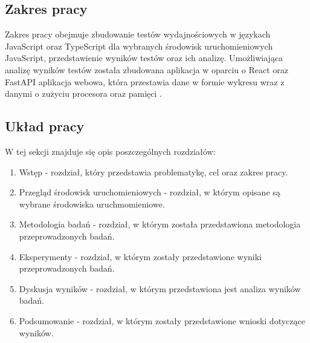 \subsection{Zakres pracy}
Zakres pracy obejmuje zbudowanie testów wydajnościowych w językach JavaScript oraz TypeScript dla wybranych środowisk uruchomieniowych JavaScript, przedstawienie wyników testów oraz ich analizę. Umożliwiająca analizę wyników testów została zbudowana aplikacja w oparciu o React \cite{React} oraz FastAPI \cite{FastAPI} aplikacja webowa, która przestawia dane w formie wykresu wraz z danymi o zużyciu procesora oraz pamięci .

\subsection{Układ pracy}
W tej sekcji znajduje się opis poszczególnych rozdziałów:
\begin{enumerate}
  \item Wstęp - rozdział, który przedstawia problematykę, cel oraz zakres pracy.
  \item Przegląd środowisk uruchomieniowych - rozdział, w którym opisane są wybrane środowiska uruchmomieniowe.
  \item Metodologia badań - rozdział, w którym została przedstawiona metodologia przeprowadzonych badań.
  \item Eksperymenty - rozdział, w którym zostały przedstawione wyniki przeprowadzonych badań.
  \item Dyskusja wyników - rozdział, w którym przedstawiona jest analiza wyników badań.
  \item Podsumowanie - rozdział, w którym zostały przedstawione wnioski dotyczące wyników.
\end{enumerate}
